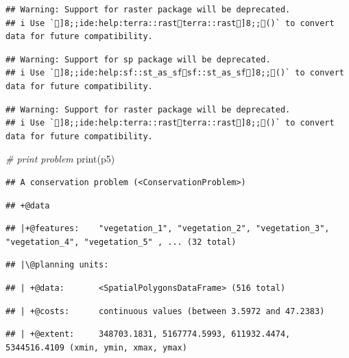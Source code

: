 \documentclass[
  12pt,
]{book}
\newenvironment{Shaded}{\begin{snugshade}}{\end{snugshade}}
\newcommand{\CommentTok}[1]{\textcolor[rgb]{0.56,0.35,0.01}{\textit{#1}}}
\newcommand{\FunctionTok}[1]{\textcolor[rgb]{0.00,0.00,0.00}{#1}}
\newcommand{\NormalTok}[1]{#1}
\begin{document}
\begin{verbatim}
## Warning: Support for raster package will be deprecated.
## i Use `]8;;ide:help:terra::rastterra::rast]8;;()` to convert data for future compatibility.
\end{verbatim}

\begin{verbatim}
## Warning: Support for sp package will be deprecated.
## i Use `]8;;ide:help:sf::st_as_sfsf::st_as_sf]8;;()` to convert data for future compatibility.
\end{verbatim}

\begin{verbatim}
## Warning: Support for raster package will be deprecated.
## i Use `]8;;ide:help:terra::rastterra::rast]8;;()` to convert data for future compatibility.
\end{verbatim}

\begin{Shaded}
\begin{Highlighting}[]
\CommentTok{\# print problem}
\FunctionTok{print}\NormalTok{(p5)}
\end{Highlighting}
\end{Shaded}

\begin{verbatim}
## A conservation problem (<ConservationProblem>)
\end{verbatim}

\begin{verbatim}
## +@data
\end{verbatim}

\begin{verbatim}
## |+@features:    "vegetation_1", "vegetation_2", "vegetation_3", "vegetation_4", "vegetation_5" , ... (32 total)
\end{verbatim}

\begin{verbatim}
## |\@planning units:
\end{verbatim}

\begin{verbatim}
## | +@data:       <SpatialPolygonsDataFrame> (516 total)
\end{verbatim}

\begin{verbatim}
## | +@costs:      continuous values (between 3.5972 and 47.2383)
\end{verbatim}

\begin{verbatim}
## | +@extent:     348703.1831, 5167774.5993, 611932.4474, 5344516.4109 (xmin, ymin, xmax, ymax)
\end{verbatim}
\end{document}
